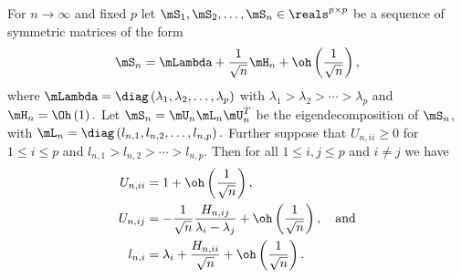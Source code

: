 \begin{lemma}\label{L:eigen-perturb}
For 
\(
    n \to \infty
\)
and fixed
\(
    p
\)
let
\(
    \mS_1, \mS_2, \ldots, \mS_n \in \reals^{p\times p}
\) 
be a sequence of symmetric matrices of the form
\[
    \mS_n 
    = 
    \mLambda
    +
    \frac{1}{\sqrt{n}}
    \mH_n
    +
    \oh\left( \frac{1}{\sqrt{n}} \right),
\]
where
\(
    \mLambda
    =
    \diag \left(
        \lambda_1,
        \lambda_2,
        \ldots,
        \lambda_p
    \right)
\)
with 
\(
    \lambda_1 > \lambda_2 > \cdots > \lambda_p
\) 
and
\(
    \mH_n = \Oh\left( 1 \right).
\)
Let $\mS_n = \mU_n \mL_n \mU_n^T$ be the eigendecomposition of $\mS_n$, with
\(
    \mL_n
    =
    \diag \left(
        l_{n,1}, l_{n,2}, \ldots, l_{n,p}
    \right).
\)
Further suppose that $U_{n,ii} \geq 0$ for $1 \leq i \leq p$ and
\(
    l_{n,1} > l_{n,2} > \cdots > l_{n,p}.
\)
Then for all $1 \leq i,j \leq p$ and $i \neq j$ we have
\begin{subequations}
\begin{align}
    U_{n,ii} 
        &= 1 
           + 
           \oh \left( 
               \frac{ 1 }{ \sqrt{n} }
           \right), \\
    U_{n,ij}
        &= -
           \frac{ 1 }{ \sqrt{n} }
           \frac{ H_{n,ij} }{ \lambda_i - \lambda_j }
           +
           \oh \left(
               \frac{ 1 }{ \sqrt{n} }
           \right), \quad \text{and} \\
    l_{n,i}
        &= \lambda_i
           + 
           \frac{ H_{n,ii} }{ \sqrt{n} }
           +
           \oh \left(
               \frac{ 1 }{ \sqrt{n} }
           \right).
\end{align}
\end{subequations}
\end{lemma}
